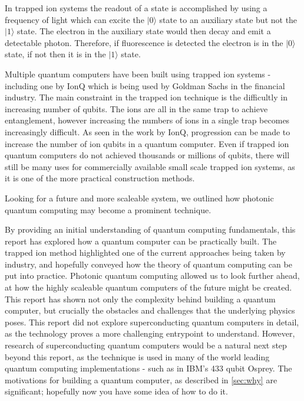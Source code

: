 In trapped ion systems the readout of a state is accomplished by using a frequency of light which can excite the $|0\rangle$ state to an auxiliary state but not the $|1\rangle$ state. The electron in the auxiliary state would then decay and emit a detectable photon. Therefore, if fluorescence is detected the electron is in the $|0\rangle $ state, if not then it is in the $|1\rangle$ state. 

Multiple quantum computers have been built using trapped ion systems - including one by IonQ which is being used by Goldman Sachs in the financial industry. \cite{noauthor_goldman_2021} 
The main constraint in the trapped ion technique is the difficultly in increasing number of qubits. The ions are all in the same trap to achieve entanglement, however increasing the numbers of ions in a single trap becomes increasingly difficult. As seen in the work by IonQ, progression can be made to increase the number of ion qubits in a quantum computer. Even if trapped ion quantum computers do not achieved thousands or millions of qubits, there will still be many uses for commercially available small scale trapped ion systems, as it is one of the more practical construction methods.

Looking for a future and more scaleable system, we outlined how photonic quantum computing may become a prominent technique.

By providing an initial understanding of quantum computing fundamentals, this report has explored how a quantum computer can be practically built. The trapped ion method highlighted one of the current approaches being taken by industry, and hopefully conveyed how the theory of quantum computing can be put into practice. Photonic quantum computing allowed us to look further ahead, at how the highly scaleable quantum computers of the future might be created. This report has shown not only the complexity behind building a quantum computer, but crucially the obstacles and challenges that the underlying physics poses. This report did not explore superconducting quantum computers in detail, as the technology proves a more challenging entrypoint to understand. However, research of superconducting quantum computers would be a natural next step beyond this report, as the technique is used in many of the world leading quantum computing implementations - such as in IBM's 433 qubit Osprey. The motivations for building a quantum computer, as described in \cref{sec:why} are significant; hopefully now you have some idea of how to do it.